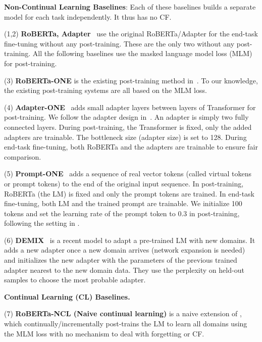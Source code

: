 \documentclass[11pt]{article}
\begin{document}
\textbf{Non-Continual Learning Baselines}: Each of these baselines builds a separate model for each
task independently.
It thus has no CF. 


(1,2) \textbf{RoBERTa, Adapter}~\cite{DBLP:journals/corr/abs-1907-11692,Houlsby2019Parameter} use the original RoBERTa/Adapter for the end-task fine-tuning without any post-training. These are the only two without any post-training. All the following baselines use the masked language model loss (MLM) for post-training. 

(3) \textbf{RoBERTa-ONE} is the existing post-training method in~\cite{DBLP:conf/acl/GururanganMSLBD20}. To our knowledge, the existing post-training systems are all based on the MLM loss. 

(4) \textbf{ Adapter-ONE}~\cite{madotto2020continual,Houlsby2019Parameter} adds small adapter layers between layers of Transformer for post-training. We follow the adapter design in~\cite{madotto2020continual,Houlsby2019Parameter}. An adapter is simply two fully connected layers. During post-training, the Transformer is fixed, only the added adapters are trainable. The bottleneck size (adapter size) is set to 128. 
During end-task fine-tuning, both RoBERTa and the adapters are trainable to ensure fair comparison.


(5) \textbf{Prompt-ONE}~\cite{DBLP:conf/emnlp/LesterAC21} adds a sequence of real vector tokens (called virtual tokens or prompt tokens) to the end of the original input sequence. In post-training, RoBERTa (the LM) is fixed and only the prompt tokens are trained. In end-task fine-tuning, both LM and the trained prompt are trainable. We initialize 100 tokens and set the learning rate of the prompt token to 0.3 in post-training, following the setting in \cite{DBLP:conf/emnlp/LesterAC21}. 

(6) \textbf{DEMIX}~\cite{gururangan2021demix} is a recent model to adapt a pre-trained LM with new domains. It adds a new adapter once a new domain arrives (network expansion is needed) and initializes the new adapter with the parameters of the previous trained adapter nearest to the new domain data. They use the perplexity on held-out samples to choose the most probable adapter. 


\textbf{Continual Learning (CL) Baselines.}


(7) \textbf{RoBERTa-NCL (Naive continual learning)} is a naive extension of \cite{DBLP:conf/acl/GururanganMSLBD20}, which continually/incrementally post-trains the LM to learn all domains using the MLM loss with no mechanism to deal with forgetting or CF.
\end{document}

